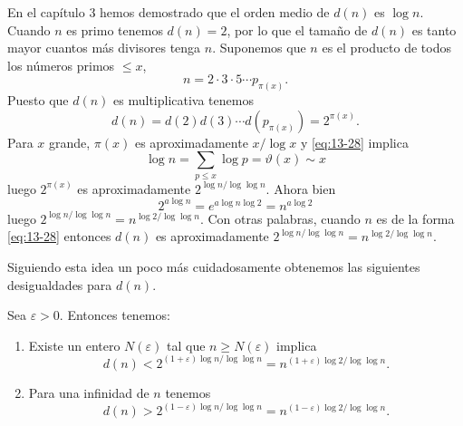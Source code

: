     En el capítulo 3 hemos demostrado que el orden medio de $d(n)$ es $\log n$. Cuando $n$ es
    primo tenemos $d(n)=2$, por lo que el tamaño de $d(n)$ es tanto mayor cuantos más divisores
    tenga $n$. Suponemos que $n$ es el producto de todos los números primos $\leq x$,
    \begin{equation}\label{eq:13-28}
        n=2\cdot3\cdot5\cdots p_{\pi(x)}.
    \end{equation}
    Puesto que $d(n)$ es multiplicativa tenemos
    \begin{equation*}
        d(n)=d(2)d(3)\cdots d(p_{\pi(x)})=2^{\pi(x)}.
    \end{equation*}
    Para $x$ grande, $\pi(x)$ es aproximadamente $x/\log x$ y \eqref{eq:13-28} implica
    \begin{equation*}
        \log n=\sum_{p\leq x}\log p=\vartheta(x)\sim x
    \end{equation*}
    luego $2^{\pi(x)}$ es aproximadamente $2^{\log n/\log\log n}$. Ahora bien
    \begin{equation*}
        2^{a\log n}=e^{a\log n\log2}=n^{a\log2}
    \end{equation*}
    luego $2^{\log n/\log\log n}=n^{\log2/\log\log n}$. Con otras palabras, cuando $n$ es de la
    forma \eqref{eq:13-28} entonces $d(n)$ es aproximadamente
    $2^{\log n/\log\log n}=n^{\log2/\log\log n}$.

    Siguiendo esta idea un poco más cuidadosamente obtenemos las siguientes desigualdades para
    $d(n)$.

    \begin{teorema}\label{teo:13-12}
        Sea $\varepsilon>0$. Entonces tenemos:
        \begin{enumerate}
            \item[(a)] Existe un entero $N(\varepsilon)$ tal que $n\geq N(\varepsilon)$
            implica
            \begin{equation*}
                d(n)<2^{(1+\varepsilon)\log n/\log\log n}=n^{(1+\varepsilon)\log2/\log\log n}.
            \end{equation*}
            \item[(b)] Para una infinidad de $n$ tenemos
            \begin{equation*}
                d(n)>2^{(1-\varepsilon)\log n/\log\log n}=n^{(1-\varepsilon)\log2/\log\log n}.
            \end{equation*}
        \end{enumerate}
    \end{teorema}

